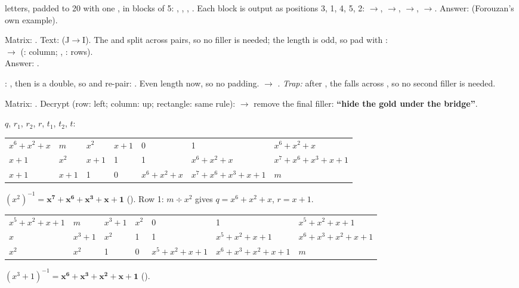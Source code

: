  letters, padded to 20 with one , in blocks of 5: , , , . Each block is output as positions 3, 1, 4, 5, 2:
$\to$, $\to$, $\to$, $\to$. Answer: \textbf{} (Forouzan's own example).

\da Matrix: .
Text:  (J$\to$I). The  and  split across pairs, so no filler is needed; the length is odd, so pad with :
\\
$\to$  \;(: column; , : rows).\\
Answer: \textbf{}.

\da {}: , then  is a double, so  and re-pair: . Even length now, so no padding.
 $\to$ \textbf{}.
\emph{Trap:} after , the  falls across , so no second filler is needed.

\da Matrix: . Decrypt (row: left; column: up; rectangle: same rule):
 $\to$ remove the final filler: \textbf{``hide the gold under the bridge''}.

\da $q$, $r_1$, $r_2$, $r$, $t_1$, $t_2$, $t$:
\begin{center}\small\setlength{\tabcolsep}{3pt}
\begin{tabular}{@{}lllllll@{}}
\toprule
$x^6{+}x^2{+}x$ & $m$ & $x^2$ & $x{+}1$ & 0 & 1 & $x^6{+}x^2{+}x$\\
$x{+}1$ & $x^2$ & $x{+}1$ & 1 & 1 & $x^6{+}x^2{+}x$ & $x^7{+}x^6{+}x^3{+}x{+}1$\\
$x{+}1$ & $x{+}1$ & 1 & 0 & $x^6{+}x^2{+}x$ & $x^7{+}x^6{+}x^3{+}x{+}1$ & $m$\\
\bottomrule
\end{tabular}
\end{center}
$(x^2)^{-1} = \mathbf{x^7 + x^6 + x^3 + x + 1}$ (). Row 1: $m \div x^2$ gives $q = x^6{+}x^2{+}x$, $r = x{+}1$.

\da
\begin{center}\small\setlength{\tabcolsep}{3pt}
\begin{tabular}{@{}lllllll@{}}
\toprule
$x^5{+}x^2{+}x{+}1$ & $m$ & $x^3{+}1$ & $x^2$ & 0 & 1 & $x^5{+}x^2{+}x{+}1$\\
$x$ & $x^3{+}1$ & $x^2$ & 1 & 1 & $x^5{+}x^2{+}x{+}1$ & $x^6{+}x^3{+}x^2{+}x{+}1$\\
$x^2$ & $x^2$ & 1 & 0 & $x^5{+}x^2{+}x{+}1$ & $x^6{+}x^3{+}x^2{+}x{+}1$ & $m$\\
\bottomrule
\end{tabular}
\end{center}
$(x^3{+}1)^{-1} = \mathbf{x^6 + x^3 + x^2 + x + 1}$ ().

